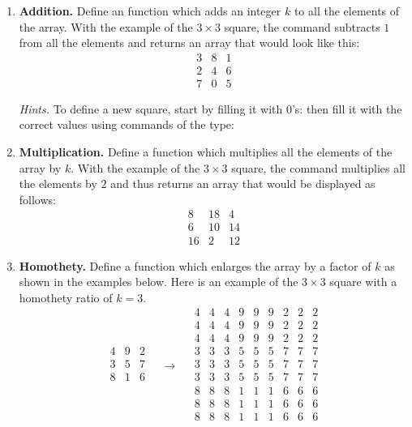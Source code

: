 \documentclass[11pt,class=report,crop=false]{standalone}
\begin{document}
\begin{activite}
\begin{enumerate}
  
  \item \textbf{Addition.} Define an  function
  which adds an integer $k$ to all the elements of the array. With the example of the $3\times 3$ square, the command  subtracts $1$ from all the elements and returns an array that would look like this:
$$\begin{array}{ccc}
3&8&1\\2&4&6\\7&0&5
\end{array}$$  

\emph{Hints.} To define a new square, start by filling it with $0$'s:
then fill it with the correct values using commands of the type:

  \item \textbf{Multiplication.} Define a function 
  which multiplies all the elements of the array by $k$. With the example of the  $3\times 3$ square, the  command multiplies all the elements by $2$ and thus returns an array that would be displayed as follows:
$$\begin{array}{ccc}
8&18&4\\6&10&14\\16&2&12
\end{array}$$ 
  
  \item \textbf{Homothety.} Define a  function
  which enlarges the array by a factor of $k$ as shown in the examples below. 
  Here is an example of the $3 \times 3$ square with a homothety ratio of $k=3$.
 $$
  \begin{array}{c|c|c}  
  4& 9& 2\\\hline
  3& 5& 7\\\hline
  8& 1& 6\\  
  \end{array} 
\quad  \longrightarrow\quad
  \begin{array}{ccc|ccc|ccc}  
  4& 4& 4& 9& 9& 9& 2& 2& 2\\
  4& 4& 4& 9& 9& 9& 2& 2& 2\\ 
  4& 4& 4& 9& 9& 9& 2& 2& 2\\\hline
  3& 3& 3& 5& 5& 5& 7& 7& 7\\
  3& 3& 3& 5& 5& 5& 7& 7& 7\\
  3& 3& 3& 5& 5& 5& 7& 7& 7\\\hline
  8& 8& 8& 1& 1& 1& 6& 6& 6\\
  8& 8& 8& 1& 1& 1& 6& 6& 6\\
  8& 8& 8& 1& 1& 1& 6& 6& 6 \\
  \end{array}
$$
  

\end{enumerate}
\end{activite}
\end{document}

